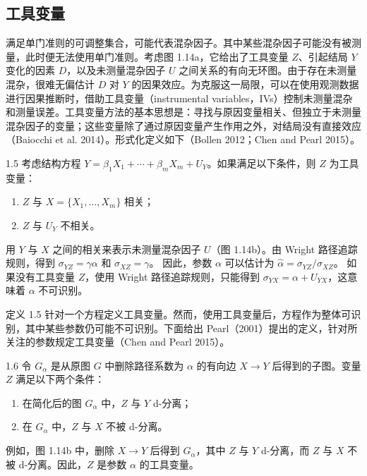 \subsection{工具变量}

满足单门准则的可调整集合，可能代表混杂因子。其中某些混杂因子可能没有被测量，此时便无法使用单门准则。考虑图 1.14a，它给出了工具变量 $Z$、引起结局 $Y$ 变化的因素 $D$，以及未测量混杂因子 $U$ 之间关系的有向无环图。由于存在未测量混杂，很难无偏估计 $D$ 对 $Y$ 的因果效应。为克服这一局限，可以在使用观测数据进行因果推断时，借助工具变量（instrumental variables，IVs）控制未测量混杂和测量误差。工具变量方法的基本思想是：寻找与原因变量相关、但独立于未测量混杂因子的变量；这些变量除了通过原因变量产生作用之外，对结局没有直接效应（Baiocchi et al. 2014）。形式化定义如下（Bollen 2012；Chen and Pearl 2015）。

\begin{bookdefinition}{1.5}
考虑结构方程 $Y=\beta_1X_1+\cdots+\beta_mX_m+U_Y$。如果满足以下条件，则 $Z$ 为工具变量：
\begin{enumerate}
\item $Z$ 与 $X=\{X_1,\ldots,X_m\}$ 相关；
\item $Z$ 与 $U_Y$ 不相关。
\end{enumerate}
用 $Y$ 与 $X$ 之间的相关来表示未测量混杂因子 $U$（图 1.14b）。由 Wright 路径追踪规则，得到
$\sigma_{YZ}=\gamma\alpha$ 和 $\sigma_{XZ}=\gamma$。
因此，参数 $\alpha$ 可以估计为
$\widehat\alpha=\sigma_{YZ}/\sigma_{XZ}$。
如果没有工具变量 $Z$，使用 Wright 路径追踪规则，只能得到 $\sigma_{YX}=\alpha+U_{YX}$，这意味着 $\alpha$ 不可识别。

定义 1.5 针对一个方程定义工具变量。然而，使用工具变量后，方程作为整体可识别，其中某些参数仍可能不可识别。下面给出 Pearl（2001）提出的定义，针对所关注的参数规定工具变量（Chen and Pearl 2015）。
\end{bookdefinition}



\begin{bookdefinition}{1.6}
令 $G_\alpha$ 是从原图 $G$ 中删除路径系数为 $\alpha$ 的有向边 $X\to Y$ 后得到的子图。变量 $Z$ 满足以下两个条件：
\begin{enumerate}
\item 在简化后的图 $G_\alpha$ 中，$Z$ 与 $Y$ d-分离；
\item 在 $G_\alpha$ 中，$Z$ 与 $X$ 不被 d-分离。
\end{enumerate}
例如，图 1.14b 中，删除 $X\to Y$ 后得到 $G_\alpha$，其中 $Z$ 与 $Y$ d-分离，而 $Z$ 与 $X$ 不被 d-分离。因此，$Z$ 是参数 $\alpha$ 的工具变量。
\end{bookdefinition}

